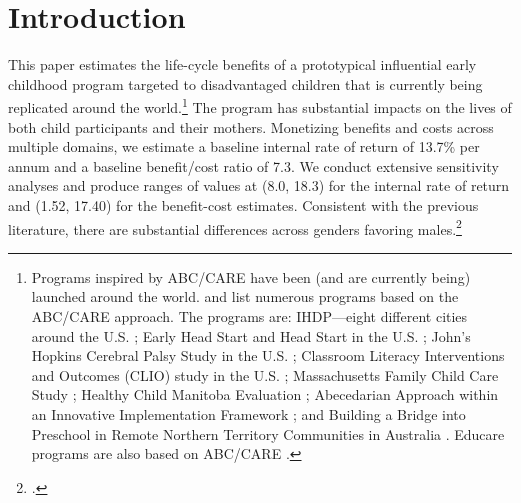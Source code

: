 \clearpage

\restoregeometry
\doublespacing
\setcounter{page}{1}

\section{Introduction}

This paper estimates the life-cycle benefits of a prototypical influential early childhood program targeted to disadvantaged children that is currently being replicated around the world.\footnote{Programs inspired by ABC/CARE have been (and are currently being) launched around the world. \citet{Sparling_2010_Highlights} and \citet{Ramey_Ramey_Lanzi_2014_Interventions} list numerous programs based on the ABC/CARE approach. The programs are: IHDP---eight different cities around the U.S. \citep{Spiker-etal_1997_Helping}; Early Head Start and Head Start in the U.S. \citep{Schneider_McDonald-eds_2007_Scale-Up_Vol-1}; John's Hopkins Cerebral Palsy Study in the U.S. \citep{Sparling_2010_Highlights}; Classroom Literacy Interventions and Outcomes (CLIO) study in the U.S. \citep{Sparling_2010_Highlights}; Massachusetts Family Child Care Study \citep{Collins_etal_2010_Massachusetts-Study}; Healthy Child Manitoba Evaluation \citep{Healthy_Child_Manitoba_2015_Starting-Early}; Abecedarian Approach within an Innovative Implementation Framework \citep{Jensen_Nielsen_2016_ABC-Programme-Pilot}; and Building a Bridge into Preschool in Remote Northern Territory Communities in Australia \citep{UMonash_Dataset_2015_URL}. Educare programs are also based on ABC/CARE \citep{Educare_2014_Research_Agenda,Yazejian_Bryant_2012_Educare}.} The program has substantial impacts on the lives of both child participants and their mothers. Monetizing benefits and costs across multiple domains, we estimate a baseline internal rate of return of 13.7\% per annum and a baseline benefit/cost ratio of 7.3. We conduct extensive sensitivity analyses and produce ranges of values at (8.0, 18.3) for the internal rate of return and (1.52, 17.40) for the benefit-cost estimates. Consistent with the previous literature, there are substantial differences across genders favoring males.\footnote{\cite{Garcia_Ziff_2017_Gender-Diff_UNPUBLISHED}.}

